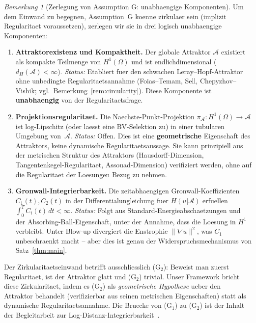 \documentclass[12pt,a4paper]{article}
\theoremstyle{definition}
\theoremstyle{plain}
\theoremstyle{remark}
\newtheorem{remark}[definition]{Bemerkung}
\begin{document}
\begin{remark}[Zerlegung von Assumption G: unabhaengige Komponenten]
\label{rem:g-decomposition}
Um dem Einwand zu begegnen, Assumption~G koenne zirkulaer sein (implizit Regularitaet voraussetzen), zerlegen wir sie in drei logisch unabhaengige Komponenten:

\begin{enumerate}
\item[\textbf{(G$_1$)}] \textbf{Attraktorexistenz und Kompaktheit.} Der globale Attraktor $\mathcal{A}$ existiert als kompakte Teilmenge von $H^1(\Omega)$ und ist endlichdimensional ($d_H(\mathcal{A}) < \infty$). \emph{Status:} Etabliert fuer den schwachen Leray--Hopf-Attraktor ohne unbedingte Regularitaetsannahme (Foias--Temam, Sell, Chepyzhov--Vishik; vgl.\ Bemerkung~\ref{rem:circularity}). Diese Komponente ist \textbf{unabhaengig} von der Regularitaetsfrage.

\item[\textbf{(G$_2$)}] \textbf{Projektionsregularitaet.} Die Naechste-Punkt-Projektion $\pi_\mathcal{A}: H^1(\Omega) \to \mathcal{A}$ ist log-Lipschitz (oder laesst eine BV-Selektion zu) in einer tubularen Umgebung von~$\mathcal{A}$. \emph{Status:} Offen. Dies ist eine \textbf{geometrische} Eigenschaft des Attraktors, keine dynamische Regularitaetsaussage. Sie kann prinzipiell aus der metrischen Struktur des Attraktors (Hausdorff-Dimension, Tangentenkegel-Regularitaet, Assouad-Dimension) verifiziert werden, ohne auf die Regularitaet der Loesungen Bezug zu nehmen.

\item[\textbf{(G$_3$)}] \textbf{Gronwall-Integrierbarkeit.} Die zeitabhaengigen Gronwall-Koeffizienten $C_1(t), C_2(t)$ in der Differentialungleichung fuer $H(u|\mathcal{A})$ erfuellen $\int_0^T C_i(t)\,dt < \infty$. \emph{Status:} Folgt aus Standard-Energieabschaetzungen und der Absorbing-Ball-Eigenschaft, unter der Annahme, dass die Loesung in $H^1$ verbleibt. Unter Blow-up divergiert die Enstrophie $\|\nabla u\|^2$, was $C_1$ unbeschraenkt macht -- aber dies ist genau der Widerspruchsmechanismus von Satz~\ref{thm:main}.
\end{enumerate}

Der Zirkularitaetseinwand betrifft ausschliesslich (G$_2$): Beweist man zuerst Regularitaet, ist der Attraktor glatt und (G$_2$) trivial. Unser Framework bricht diese Zirkularitaet, indem es (G$_2$) als \emph{geometrische Hypothese} ueber den Attraktor behandelt (verifizierbar aus seinen metrischen Eigenschaften) statt als dynamische Regularitaetsannahme. Die Bruecke von (G$_1$) zu (G$_2$) ist der Inhalt der Begleitarbeit zur Log-Distanz-Integrierbarkeit~\cite{Geiger2026-LDI}.
\end{remark}
\end{document}
